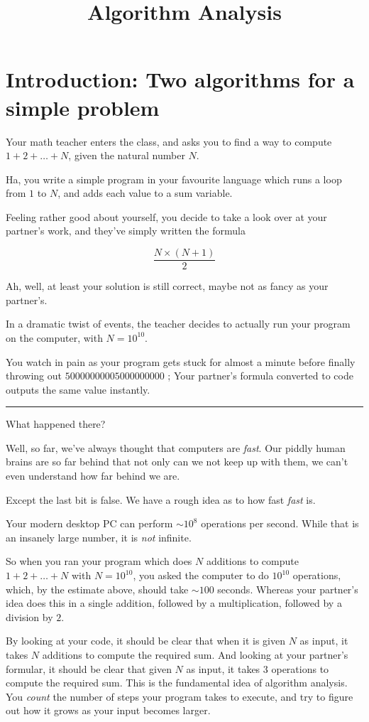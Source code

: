\documentclass{article}
\title{Algorithm Analysis}
\begin{document}
\maketitle

\section{Introduction: Two algorithms for a simple problem}
Your math teacher enters the class, and asks you to find a way
to compute $1 + 2 + \dots + N$, given the natural number $N$.

Ha, you write a simple program in your favourite language which
runs a loop from $1$ to $N$, and adds each value to a sum variable.

Feeling rather good about yourself, you decide to take a look over
at your partner's work, and they've simply written the formula

\[\frac{N\times(N + 1)}2\]

Ah, well, at least your solution is still correct, maybe not as
fancy as your partner's.

In a dramatic twist of events, the teacher decides to actually run
your program on the computer, with $N = 10^{10}$.

You watch in pain as your program gets stuck for almost a minute
before finally throwing out $50000000005000000000$ ; 
Your partner's formula converted to code outputs the same value instantly.

\rule{\textwidth}{0.25pt}

What happened there?

Well, so far, we've always thought that computers are \emph{fast}.
Our piddly human brains are so far behind that not only can we not
keep up with them, we can't even understand how far behind we are.

Except the last bit is false.
We have a rough idea as to how fast \emph{fast} is.

Your modern desktop PC can perform $\sim 10^8$ operations per second.
While that is an insanely large number, it is \emph{not} infinite.

So when you ran your program which does $N$ additions to compute
$1 + 2 + \dots + N$ with $N = 10^{10}$, you asked the computer to do
$10^{10}$ operations, which, by the estimate above, should take $\sim 100$
seconds.
Whereas your partner's idea does this in a single addition,
followed by a multiplication, followed by a division by $2$.

By looking at your code, it should be clear that when it is given $N$
as input, it takes $N$ additions to compute the required sum.
And looking at your partner's formular, it should be clear that given $N$ as
input, it takes $3$ operations to compute the required sum.  
This is the fundamental idea of algorithm analysis.
You \emph{count} the number of steps your program takes to execute, and
try to figure out how it grows as your input becomes larger.
\end{document}

